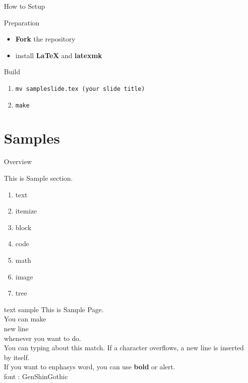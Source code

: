 \documentclass[aspectratio=1610,14pt]{beamer}
\begin{document}
\begin{frame}{How to Setup}
    \begin{textblock}{Preparation}
        \begin{itemize}
            \item{\textbf{Fork} the repository}
            \item{install \textbf{LaTeX} and \textbf{latexmk}}
        \end{itemize}
    \end{textblock}

    \begin{textblock}{Build}
        \begin{enumerate}
            \item{\lstinline|mv sampleslide.tex (your slide title)|}
            \item{\lstinline|make|}
        \end{enumerate}
    \end{textblock}
\end{frame}

\section{Samples}
\begin{frame}
    \tableofcontents[currentsection]
\end{frame}

\begin{frame}{Overview}
    \begin{textblock}{This is Sample section.}
        \begin{enumerate}
            \item{text}
            \item{itemize}
            \item{block}
            \item{code}
            \item{math}
            \item{image} 
            \item{tree}
        \end{enumerate}
    \end{textblock}
\end{frame}

\begin{frame}{text sample}
    This is Sample Page.\\
    You can make \\
    \alert{new line}\\
    whenever you want to do.\\
    You can typing about this match. If a character overflows, a new line is inserted by itself.\\
    If you want to enphasys word, you can use \textbf{bold} or \alert{alert}. \\
    font : GenShinGothic
\end{frame}
\end{document}
